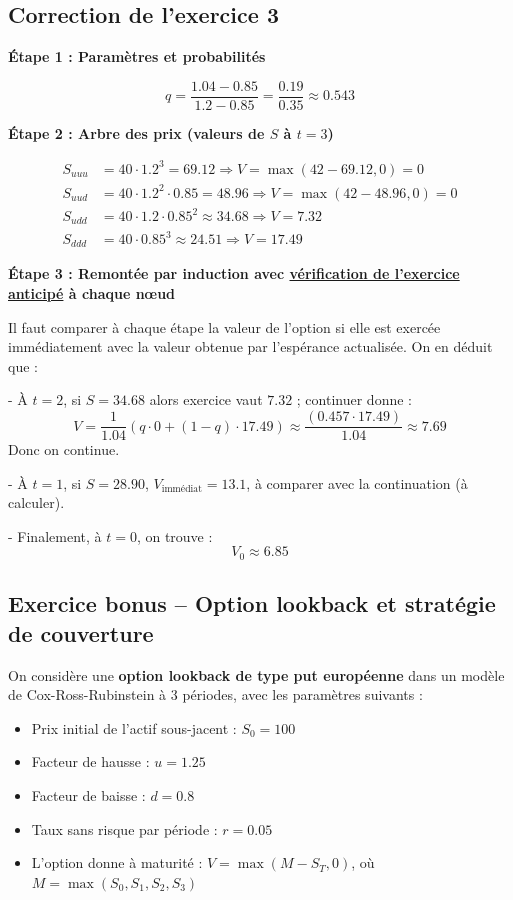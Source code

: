 \documentclass[12pt,a4paper]{article}
\begin{document}
\vspace{0.5cm}

\subsection*{Correction de l’exercice 3}

\textbf{Étape 1 : Paramètres et probabilités}

\[
q = \frac{1.04 - 0.85}{1.2 - 0.85} = \frac{0.19}{0.35} \approx 0.543
\]

\textbf{Étape 2 : Arbre des prix (valeurs de $S$ à $t=3$)}

\[
\begin{aligned}
S_{uuu} &= 40 \cdot 1.2^3 = 69.12 \Rightarrow V = \max(42 - 69.12, 0) = 0 \\
S_{uud} &= 40 \cdot 1.2^2 \cdot 0.85 = 48.96 \Rightarrow V = \max(42 - 48.96, 0) = 0 \\
S_{udd} &= 40 \cdot 1.2 \cdot 0.85^2 \approx 34.68 \Rightarrow V = 7.32 \\
S_{ddd} &= 40 \cdot 0.85^3 \approx 24.51 \Rightarrow V = 17.49
\end{aligned}
\]

\textbf{Étape 3 : Remontée par induction avec \underline{vérification de l’exercice anticipé} à chaque nœud}

Il faut comparer à chaque étape la valeur de l’option si elle est exercée immédiatement avec la valeur obtenue par l’espérance actualisée. On en déduit que :

- À $t=2$, si $S=34.68$ alors exercice vaut $7.32$ ; continuer donne :
  \[
  V = \frac{1}{1.04}(q \cdot 0 + (1 - q) \cdot 17.49) \approx \frac{(0.457 \cdot 17.49)}{1.04} \approx 7.69
  \]
  Donc on continue.

- À $t=1$, si $S=28.90$, $V_\text{immédiat} = 13.1$, à comparer avec la continuation (à calculer).

- Finalement, à $t=0$, on trouve :
  \[
  V_0 \approx \boxed{6.85}
  \]

\subsection*{Exercice bonus -- Option lookback et stratégie de couverture}

On considère une \textbf{option lookback de type put européenne} dans un modèle de Cox-Ross-Rubinstein à 3 périodes, avec les paramètres suivants :

\begin{itemize}
    \item Prix initial de l’actif sous-jacent : $S_0 = 100$
    \item Facteur de hausse : $u = 1.25$
    \item Facteur de baisse : $d = 0.8$
    \item Taux sans risque par période : $r = 0.05$
    \item L'option donne à maturité : \( V = \max(M - S_T, 0) \), où \( M = \max(S_0, S_1, S_2, S_3) \)
\end{itemize}
\end{document}
